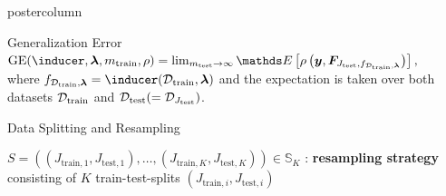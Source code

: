 \documentclass{beamer}
\begin{document}
\begin{frame}[fragile]{}
\begin{columns}
\begin{column}{.31\textwidth}
\begin{beamercolorbox}[center]{postercolumn}
\begin{minipage}{.98\textwidth}
{\begin{myblock}{Generalization Error}
 $\mathrm{GE}(\inducer, \bm{\lambda}, m_{\mathrm{train}}, \rho) = \lim_{m_{\mathrm{test}}\rightarrow\infty} \E \left[ \rho\left(\boldsymbol{y}, \boldsymbol{F}_{J_{\mathrm{test}},f_{\mathcal{D}_{\mathrm{train}}, \bm{\lambda}}}\right)\right],$ \\
 
where $f_{\mathcal{D}_{\mathrm{train}}, \bm{\lambda}} = \inducer(\mathcal{D}_{\mathrm{train}}, \bm{\lambda})$ and the expectation is taken over both datasets $\mathcal{D}_{\text{train}}$ and $\mathcal{D}_{\text{test}} (= \mathcal{D}_{J_\mathrm{test}})$.
\end{myblock}

\begin{myblock}{Data Splitting and Resampling}

$S = \left((J_{\mathrm{train},1}, J_{\mathrm{test},1}),\dots,
(J_{\mathrm{train},K}, J_{\mathrm{test},K})\right) \in \mathds{S}_K$ : \textbf{resampling strategy} consisting of $K$ train-test-splits $(J_{\mathrm{train},i}, J_{\mathrm{test},i})$\\


\end{myblock}}
\end{minipage}
\end{beamercolorbox}
\end{column}
\end{columns}
\end{frame}
\end{document}
